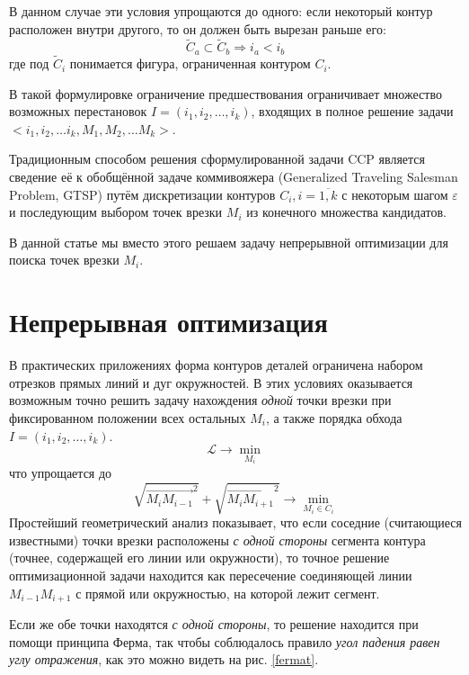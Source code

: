 \documentclass{article}
\begin{document}
В данном случае эти условия упрощаются до одного:
если некоторый контур расположен внутри другого,
то он должен быть вырезан раньше его:
$$
\tilde C_a \subset \tilde C_b
\Rightarrow
i_a < i_b
$$
где под
$\tilde C_i$ понимается фигура,
ограниченная контуром $C_i$.

В такой формулировке ограничение предшествования
ограничивает множество возможных перестановок
$I=(i_1, i_2, \dots, i_k)$,
входящих в полное решение задачи
$\big<
i_1, i_2, \dots i_k,
M_1, M_2, \dots M_k
\big>$.

Традиционным способом решения сформулированной задачи CCP
является сведение её к обобщённой задаче коммивояжера
(Generalized Traveling Salesman Problem, GTSP)
путём дискретизации контуров
$C_i, i=\overline{1, k}$
с некоторым шагом $\varepsilon$
и последующим выбором точек врезки
$M_i$ из конечного множества кандидатов.

В данной статье мы вместо этого решаем задачу непрерывной оптимизации
для поиска точек врезки $M_i$.

\section{Непрерывная оптимизация}
В практических приложениях
форма контуров деталей ограничена
набором отрезков прямых линий и дуг окружностей.
В этих условиях оказывается возможным
точно решить задачу нахождения
\textit{одной} точки врезки
при фиксированном положении всех остальных $M_i$,
а также порядка обхода $I=(i_1, i_2, \dots, i_k)$.
$$
\mathcal L \to \min_{M_i}
$$
что упрощается до
$$
\sqrt{\overrightarrow{M_i M_{i-1}}^2} +
\sqrt{\overrightarrow{M_i M_{i+1}}^2} \to
\min_{M_i \in C_i}
$$
Простейший геометрический анализ показывает,
что если соседние
(считающиеся известными)
точки врезки расположены
\textit{с одной стороны}
сегмента контура
(точнее, содержащей его линии или окружности),
то точное решение оптимизационной задачи
находится как пересечение
соединяющей линии $M_{i-1}M_{i+1}$
с прямой или окружностью,
на которой лежит сегмент.

Если же обе точки находятся
\textit{с одной стороны},
то решение находится при помощи принципа Ферма,
так чтобы соблюдалось правило
\textit{угол падения равен углу отражения},
как это можно видеть на рис. \ref{fermat}.
\end{document}
